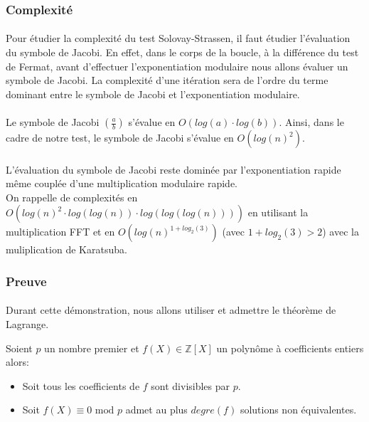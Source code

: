 	
	\subsubsection{Complexité}
		\paragraph{}Pour étudier la complexité du test Solovay-Strassen, il faut étudier l'évaluation du symbole de Jacobi. En effet, dans le corps de la boucle, à la différence du test de Fermat, avant d'effectuer l'exponentiation modulaire nous allons évaluer un symbole de Jacobi. La complexité d'une itération sera de l'ordre du terme dominant entre le symbole de Jacobi et l'exponentiation modulaire.
		\paragraph{}Le symbole de Jacobi $\left ( \frac{a}{b} \right )$ s'évalue en $O(log(a) \cdot log(b))$. Ainsi, dans le cadre de notre test, le symbole de Jacobi s'évalue en $O(log(n)^{2})$.
		\paragraph{}L'évaluation du symbole de Jacobi reste dominée par l'exponentiation rapide même couplée d'une multiplication modulaire rapide.\\
				On rappelle de complexités en $O(log(n)^{2} \cdot log(log(n)) \cdot log(log(log(n))))$ en utilisant la multiplication FFT et en $ O(log(n)^{1 + log_{2}(3)})$ (avec $1 + log_{2}(3) > 2$) avec la muliplication de Karatsuba.
				
	\subsubsection{Preuve}
		\paragraph{}Durant cette démonstration, nous allons utiliser et admettre le théorème de Lagrange.
		\vspace{-1.5em}\begin{adjustwidth}{1.5cm}{1.5cm} 
		\begin{Th}
			\label{ThLagrange}
			Soient $p$ un nombre premier et $f(X) \in \mathbb{Z}[X]$ un polynôme à coefficients entiers alors:
			\begin{itemize}
			\item Soit tous les coefficients de $f$ sont divisibles par $p$.
			\item Soit $f(X) \equiv 0 \text{ mod } p$ admet au plus $degre(f)$ solutions non équivalentes.
			\end{itemize}
		\end{Th}
		\end{adjustwidth}\vspace{0.5em}
		

